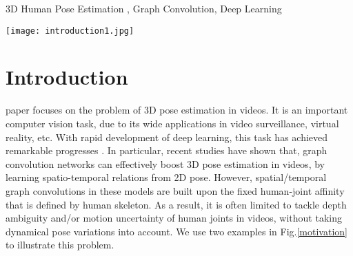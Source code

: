 \documentclass[journal]{IEEEtran}
\begin{document}
\begin{IEEEkeywords}
3D Human Pose Estimation , Graph Convolution, Deep Learning\end{IEEEkeywords}






\IEEEpeerreviewmaketitle




\begin{figure*}[t]
\centering
\texttt{[image: introduction1.jpg]}
\caption{Our motivations.
The fixed human-joint affinity often limits adaptation capacity of spatial/temporal graph convolution to tackle complex pose variations in videos.
To alleviate such difficulty,
the graph affinity should depend on the specific human pose in the video.
To achieve this goal,
we propose to learn spatial/temporal human-joint affinity dynamically,
according to spatial/temporal similarity between joints.
For example,
\textit{wrist} is spatially closer to \textit{hip} and \textit{pelvis} in the \textit{SittingDown} case of Fig.\ref{motivation}(a).
Hence,
we should further enhance such spatial affinity to estimate \textit{wrist} at Frame .
Similarly,
\textit{ankle} keeps the consistent movement with \textit{wrist} and \textit{shoulder} in the \textit{Walking} case.
Hence,
we should further enhance such temporal affinity to estimate \textit{ankle} at Frame .
More explanations can be found in the introduction.
}
\label{motivation}
\vspace{-0.3cm}
\end{figure*}


\section{Introduction}
 paper focuses on the problem of 3D pose estimation in videos.
It is an important computer vision task,
due to its wide applications in
video surveillance,
virtual reality,
etc.
With rapid development of deep learning,
this task has achieved remarkable progresses \cite{Lin_2017_CVPR,eccv2018temporal,pavllo:videopose3d:2019}.
In particular,
recent studies \cite{semanticsgcn,Ci_2019_ICCV,Cai_2019_ICCV}  have shown that,
graph convolution networks can effectively boost 3D pose estimation in videos,
by learning spatio-temporal relations from 2D pose.
However,
spatial/temporal graph convolutions in these models are built upon the fixed human-joint affinity that is defined by human skeleton.
As a result,
it is often limited to tackle depth ambiguity and/or motion uncertainty of human joints in videos,
without taking dynamical pose variations into account.
We use two examples in Fig.\ref{motivation} to illustrate this problem.
\end{document}
